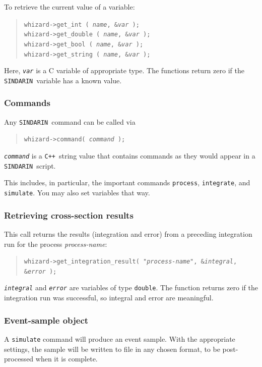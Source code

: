 \documentclass[12pt]{book}
\newcommand{\ttt}[1]{\texttt{#1}}
\newcommand{\sindarin}{\ttt{SINDARIN}}
\newcommand{\cpp}{\ttt{C++}}
\begin{document}
To retrieve the current value of a variable:
\begin{quote}
  \tt whizard->get\_int ( \textit{name}, \&\textit{var} );
  \\
  \tt whizard->get\_double ( \textit{name}, \&\textit{var} );
  \\
  \tt whizard->get\_bool ( \textit{name}, \&\textit{var} );
  \\
  \tt whizard->get\_string ( \textit{name}, \&\textit{var} );
\end{quote}
Here, \ttt{\it var} is a C variable of appropriate type.  The functions return
zero if the \sindarin\ variable has a known value.

\subsubsection{Commands}
Any \sindarin\ command can be called via
\begin{quote}
  \tt whizard->command( \textit{command} );
\end{quote}
\ttt{\it command} is a \cpp\ string value that contains commands as they
would appear in a \sindarin\ script.

This includes, in particular, the important commands \ttt{process},
\ttt{integrate}, and \ttt{simulate}.  You may also set variables that way.

\subsubsection{Retrieving cross-section results}
This call returns the results (integration and error) from a preceding
integration run for the process \textit{process-name}:
\begin{quote}
  \tt whizard->get\_integration\_result( "\textit{process-name}",
  \&\textit{integral}, \&\textit{error} );
\end{quote}
\ttt{\it integral} and \ttt{\it error} are variables of type \ttt{double}.
The function returns zero if the integration run was successful, so integral
and error are meaningful.

\subsubsection{Event-sample object}
A \ttt{simulate} command will produce an event sample.  With the appropriate
settings, the sample will be written to file in any chosen format, to be
post-processed when it is complete.
\end{document}
